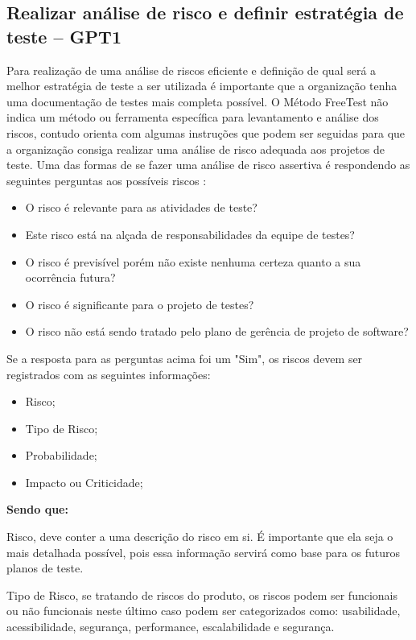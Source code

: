\subsection{Realizar análise de risco e definir estratégia de teste – GPT1}
\label{sec:guiagpt1}

Para realização de uma análise de riscos eficiente e definição de qual será a melhor estratégia de teste a ser utilizada é importante que a organização tenha uma documentação de testes mais completa possível. O Método FreeTest não indica um método ou ferramenta específica para levantamento e análise dos riscos, contudo orienta com algumas instruções que podem ser seguidas para que a organização consiga realizar uma análise de risco adequada aos projetos de teste. Uma das formas de se fazer uma análise de risco assertiva é respondendo as seguintes perguntas aos possíveis riscos \cite{Rios}:

\begin{itemize}
\item O risco é relevante para as atividades de teste?
\item Este risco está na alçada de responsabilidades da equipe de testes?
\item O risco é previsível porém não existe nenhuma certeza quanto a sua ocorrência futura?
\item O risco é significante para o projeto de testes?
\item O risco não está sendo tratado pelo plano de gerência de projeto de software?
\end{itemize}

Se a resposta para as perguntas acima foi um "Sim", os riscos devem ser registrados com as seguintes informações:

\begin{itemize}
\item Risco;
\item Tipo de Risco;
\item Probabilidade;
\item Impacto ou Criticidade;
\end{itemize}

\textbf{Sendo que:}

Risco, deve conter a uma descrição do risco em si. É importante que ela seja o mais detalhada possível, pois essa informação servirá como base para os futuros planos de teste.

Tipo de Risco, se tratando de riscos do produto, os riscos podem ser funcionais ou não funcionais neste último caso podem ser categorizados como: usabilidade, acessibilidade, segurança, performance, escalabilidade e segurança.

